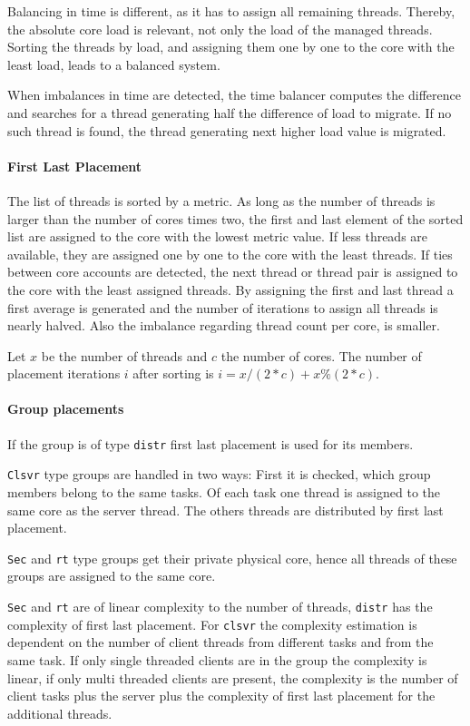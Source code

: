 Balancing in time is different, as it has to assign all remaining threads.
Thereby, the absolute core load is relevant, not only the load of the managed
threads.
Sorting the threads by load, and assigning them one by one to the
core with the least load, leads to a balanced system.

When imbalances in time are detected, the time balancer computes the difference
and searches for a thread generating half the difference of load to migrate.
If no such thread is found, the thread generating next higher load value is
migrated.


\paragraph{First Last Placement}
The list of threads is sorted by a metric.
As long as the number of threads is larger than the number of cores times two,
the first and last element of the sorted list are assigned to the core with the
lowest metric value.
If less threads are available, they are assigned one by one to the core with
the least threads.
If ties between core accounts are detected, the next thread or thread pair is
assigned to the core with the least assigned threads.
By assigning the first and last thread a first average is generated and the
number of iterations to assign all threads is nearly halved.
Also the imbalance regarding thread count per core, is smaller.

Let $x$ be the number of threads and $c$ the number of cores.
The number of placement iterations $i$ after sorting is
$i = x / (2*c) + x \% (2*c)$.


\paragraph{Group placements}
If the group is of type \texttt{distr} first last placement is used for its
members.

\texttt{Clsvr} type groups are handled in two ways: First it is checked, which
group members belong to the same tasks.
Of each task one thread is assigned to the same core as the server thread.
The others threads are distributed by first last placement.

\texttt{Sec} and \texttt{rt} type groups get their private physical core, hence
all threads of these groups are assigned to the same core.

\texttt{Sec} and \texttt{rt} are of linear complexity to the number of threads,
\texttt{distr} has the complexity of first last placement.
For \texttt{clsvr} the complexity estimation is dependent on the number of client
threads from different tasks and from the same task.
If only single threaded clients are in the group the complexity is linear, if
only multi threaded clients are present, the complexity is the number of
client tasks plus the server plus the complexity of first last placement for
the additional threads.


